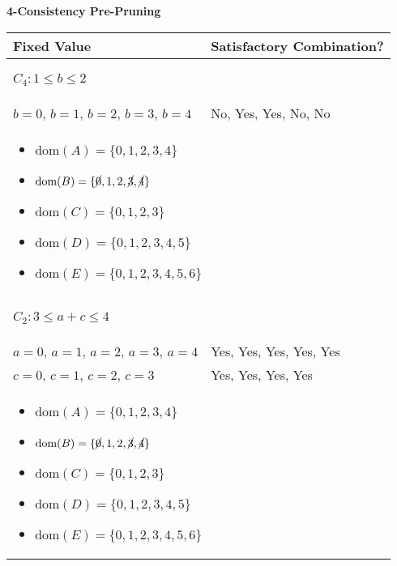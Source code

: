 \begin{example} \textbf{4-Consistency Pre-Pruning}
    \begin{center}
        \begin{tabular}{ll}
            \textbf{Fixed Value} & \textbf{Satisfactory Combination?} \\
            \toprule
            \multicolumn{2}{p{\linewidth}}{
            \begin{center}
                $C_4: 1 \leq b \leq 2$
            \end{center}} \\
            \midrule
                $b = 0$, $b=1$, $b=2$, $b=3$, $b=4$ & No, Yes, Yes, No, No \\
            \multicolumn{2}{p{\linewidth}}{
            \begin{itemize}
                \item $\text{dom}(A) = \{0, 1, 2, 3, 4\}$
                \item $\text{dom}(B) = \{\cancel{0}, 1, 2, \cancel{3}, \cancel{4}\} $
                \item $\text{dom}(C) = \{0, 1, 2, 3\} $
                \item $\text{dom}(D) = \{0, 1, 2, 3, 4, 5\} $
                \item $\text{dom}(E) = \{0, 1, 2, 3, 4, 5, 6\} $
            \end{itemize}} \\
            \midrule
            \multicolumn{2}{p{\linewidth}}{
            \begin{center}
                $C_2: 3 \leq a + c \leq 4$
            \end{center}} \\
            \midrule
                $a=0$, $a=1$, $a=2$, $a=3$, $a=4$ & Yes, Yes, Yes, Yes, Yes \\
                $c=0$, $c=1$, $c=2$, $c=3$ & Yes, Yes, Yes, Yes \\
            \multicolumn{2}{p{\linewidth}}{
            \begin{itemize}
                \item $\text{dom}(A) = \{0, 1, 2, 3, 4\}$
                \item $\text{dom}(B) = \{\cancel{0}, 1, 2, \cancel{3}, \cancel{4}\} $
                \item $\text{dom}(C) = \{0, 1, 2, 3\} $
                \item $\text{dom}(D) = \{0, 1, 2, 3, 4, 5\} $
                \item $\text{dom}(E) = \{0, 1, 2, 3, 4, 5, 6\} $

\end{itemize}}
\end{tabular}
\end{center}
\end{example}
